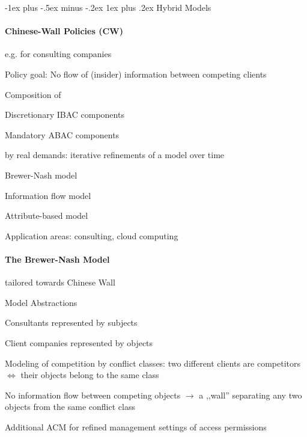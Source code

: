 \documentclass[a4paper]{article}
\makeatletter
\renewcommand{\subsubsection}{\@startsection{subsubsection}{3}{0mm}%
                {-1ex plus -.5ex minus -.2ex}%
                {1ex plus .2ex}%
                {\normalfont\small\bfseries}}
\makeatother
\begin{document}
\begin{multicols}{3}
    \subsubsection{Hybrid Models}
    \paragraph{Chinese-Wall Policies (CW)}
    e.g. for consulting companies

    Policy goal: No flow of (insider) information between competing clients
    \begin{itemize*}
        \item Composition of
        \begin{itemize*}
            \item Discretionary IBAC components
            \item Mandatory ABAC components
        \end{itemize*}
        \item by real demands: iterative refinements of a model over time
        \begin{itemize*}
            \item Brewer-Nash model
            \item Information flow model
            \item Attribute-based model
        \end{itemize*}
        \item Application areas: consulting, cloud computing
    \end{itemize*}

    \paragraph{The Brewer-Nash Model}
    tailored towards Chinese Wall

    Model Abstractions
    \begin{itemize*}
        \item Consultants represented by subjects
        \item Client companies represented by objects
        \item Modeling of competition by conflict classes: two different clients are competitors $\Leftrightarrow$ their objects belong to the same class
        \item No information flow between competing objects $\rightarrow$ a ,,wall'' separating any two objects from the same conflict class
        \item Additional ACM for refined management settings of access permissions
    \end{itemize*}


\end{multicols}
\end{document}

